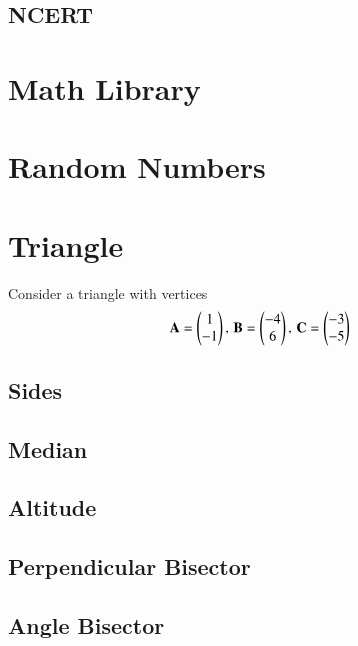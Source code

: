 \documentclass[journal]{IEEEtran}
\begin{document}
\subsection{NCERT}

\section{Math Library}

\section{Random Numbers}

\newpage
\appendices
\section{Triangle}
Consider a triangle with vertices
		\begin{align}
			\label{eq:app-tri-pts}
			\mathbf{A} = \begin{pmatrix}1 \\ -1\end{pmatrix},\,
			\mathbf{B} = \begin{pmatrix}-4 \\ 6\end{pmatrix},\,
			\mathbf{C} = \begin{pmatrix}-3 \\ -5\end{pmatrix}
		\end{align}
\subsection{Sides}

\subsection{Median}

\subsection{Altitude}

\subsection{Perpendicular Bisector}

\subsection{Angle Bisector}

\end{document}

